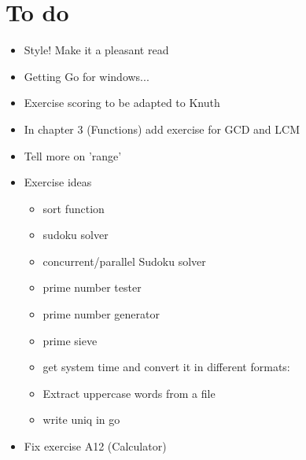 \section{To do}

\begin{itemize}
\item
Style! Make it a pleasant read
\item
Getting Go for windows...
\item
Exercise scoring to be adapted to Knuth
\item
In chapter 3 (Functions) add exercise for GCD and LCM
\item
Tell more on 'range'
\item
Exercise ideas
\begin{itemize}
\item
sort function
\item
sudoku solver
\item
concurrent/parallel Sudoku solver
\item
prime number tester
\item
prime number generator
\item
prime sieve
\item
get system time and convert it in different formats:
\item
Extract uppercase words from a file
\item
write uniq in go
\end{itemize}
\item
Fix exercise A12 (Calculator)
\end{itemize}
